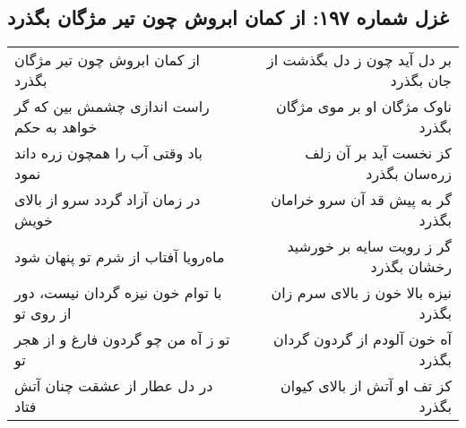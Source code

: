 \begin{center}
\section*{غزل شماره ۱۹۷: از کمان ابروش چون تیر مژگان بگذرد}
\label{sec:197}
\begin{longtable}{l p{0.5cm} r}
از کمان ابروش چون تیر مژگان بگذرد
&&
بر دل آید چون ز دل بگذشت از جان بگذرد
\\
راست اندازی چشمش بین که گر خواهد به حکم
&&
ناوک مژگان او بر موی مژگان بگذرد
\\
باد وقتی آب را همچون زره داند نمود
&&
کز نخست آید بر آن زلف زره‌سان بگذرد
\\
در زمان آزاد گردد سرو از بالای خویش
&&
گر به پیش قد آن سرو خرامان بگذرد
\\
ماه‌رویا آفتاب از شرم تو پنهان شود
&&
گر ز رویت سایه بر خورشید رخشان بگذرد
\\
با توام خون نیزه گردان نیست، دور از روی تو
&&
نیزه بالا خون ز بالای سرم زان بگذرد
\\
تو ز آه من چو گردون فارغ و از هجر تو
&&
آه خون آلودم از گردون گردان بگذرد
\\
در دل عطار از عشقت چنان آتش فتاد
&&
کز تف او آتش از بالای کیوان بگذرد
\\
\end{longtable}
\end{center}
